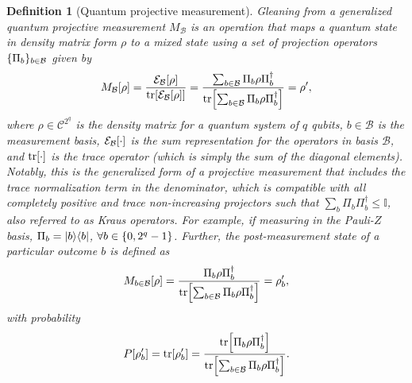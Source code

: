 \documentclass{article}
\newtheorem{definition}{Definition}[section]
\DeclarePairedDelimiter{\bra}{\langle}{\rvert} %
\DeclarePairedDelimiter{\ket}{\lvert}{\rangle} %
\DeclarePairedDelimiter{\bparen}{[}{]} %
\DeclarePairedDelimiter{\set}{\{}{\}} %
\newcommand{\E}{\mathbb{E}} %
\newcommand{\bfunc}[2]{#1\bparen*{#2}} %
\begin{document}

% 
\begin{definition}[Quantum projective measurement]
Gleaning from \cite[section 8.2]{nielsen_quantum_2012}
%
a generalized quantum projective measurement $M_{\mathcal{B}}$ is an operation that maps a quantum state in density matrix form $\rho$ to a mixed state using a set of projection operators $\set{\Pi_b}_{b \in \mathcal{B}}$ given by
% 
\begin{equation}\label{eq:def:measurement}
\bfunc{M_{\mathcal{B}}}{\rho} 
= \frac{\bfunc{\mathcal{E}_{\mathcal{B}}}{\rho}}{\bfunc{\textrm{tr}}{\bfunc{\mathcal{E}_{\mathcal{B}}}{\rho}}}
= \frac{\sum_{b \in \mathcal{B}} \Pi_b \rho \Pi^{\dagger}_b}{\bfunc{\textrm{tr}}{\sum_{b \in \mathcal{B}} \Pi_b \rho \Pi^{\dagger}_b}}
= \rho',
\end{equation}
% 
where $\rho \in \mathcal{C}^{2^q}$ is the density matrix for a quantum system of $q$ qubits, $b \in \mathcal{B}$ is the measurement basis, $\bfunc{\mathcal{E}_{\mathcal{B}}}{\cdot}$ is the sum representation for the operators in basis $\mathcal{B}$, and $\bfunc{\textrm{tr}}{\cdot}$ is the trace operator (which is simply the sum of the diagonal elements). Notably, this is the \emph{generalized} form of a projective measurement that includes the trace normalization term in the denominator, which is compatible with all completely positive and trace non-increasing projectors such that $\sum_{b} \Pi_b \Pi^{\dagger}_b \leq \mathbb{I}$, also referred to as \emph{Kraus operators}. For example, if measuring in the Pauli-$Z$ basis, $\Pi_b = \ket{b}\bra{b}$, $\forall b \in \set{0,2^{q}-1}$. 
% 
Further, the post-measurement state of a particular outcome $b$ is defined as
% 
\begin{equation}\label{eq:def:measurement_outcome}
\bfunc{M_{b \in \mathcal{B}}}{\rho} 
= \frac{\Pi_b \rho \Pi^{\dagger}_b}{\bfunc{\textrm{tr}}{\sum_{b \in \mathcal{B}} \Pi_b \rho \Pi^{\dagger}_b}}
= \rho'_{b},
\end{equation}
% 
with probability
% 
\begin{equation}\label{eq:def:measurement_outcome_prob}
\bfunc{P}{\rho'_{b}}
= \bfunc{\textrm{tr}}{\rho'_{b}}
= \frac{\bfunc{\textrm{tr}}{\Pi_b \rho \Pi^{\dagger}_b}}{\bfunc{\textrm{tr}}{\sum_{b \in \mathcal{B}} \Pi_b \rho \Pi^{\dagger}_b}}.
\end{equation}
\end{definition}
\end{document}
